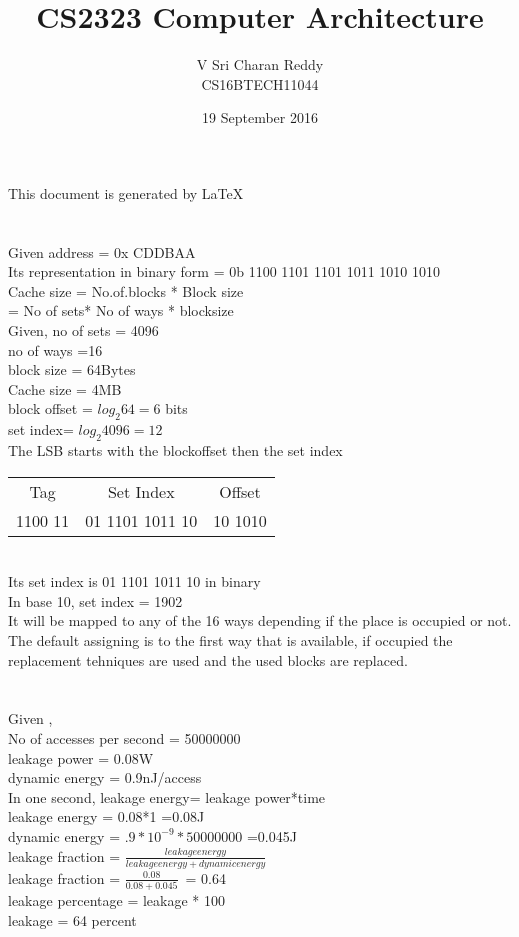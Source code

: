 \documentclass[12pt]{article}
\title{CS2323 Computer Architecture}
\author{V Sri Charan Reddy \\ CS16BTECH11044}
\date{19 September 2016}
\begin{document}
\maketitle

This document is generated by \LaTeX

\section{}
Given address = 0x CDDBAA\\
Its representation in binary form = 0b 1100 1101 1101 1011 1010 1010\\
Cache size = No.of.blocks * Block size\\
           = No of sets* No of ways * blocksize\\
Given, no of sets = 4096\\
no of ways =16\\
block size = 64Bytes\\
Cache size = 4MB\\
block offset = $log_2 64 = 6$ bits\\ 
set index= $log_2 4096 = 12$\\
The LSB starts with the blockoffset then the set index \\


	\begin{tabular}{ |c|c|c| } 
		\hline
		Tag & Set Index & Offset \\ 
		1100 11 & 01 1101 1011 10 & 10 1010\\  
		\hline
	\end{tabular}\\
Its set index is 01 1101 1011 10 in binary \\
In base 10, set index = 1902\\
It will be mapped to any of the 16 ways depending if the place is occupied or not. The default assigning is to the first way that is available, if occupied the replacement tehniques are used and the used blocks are replaced.\\


\section{}
Given , \\
No of accesses per second = 50000000\\
leakage power = 0.08W\\
dynamic energy = 0.9nJ/access\\
In one second, leakage energy= leakage power*time\\
leakage energy = 0.08*1 =0.08J\\
dynamic energy = $.9 * 10^{-9} *50000000$ =0.045J\\
leakage fraction =
\(\frac{leakage energy}{leakage energy + dynamic energy}\) \\
leakage fraction =
\(\frac{0.08}{0.08+0.045}\)\      =
0.64\\
leakage percentage = leakage * 100\\
leakage = 64 percent \\  
\end{document}
